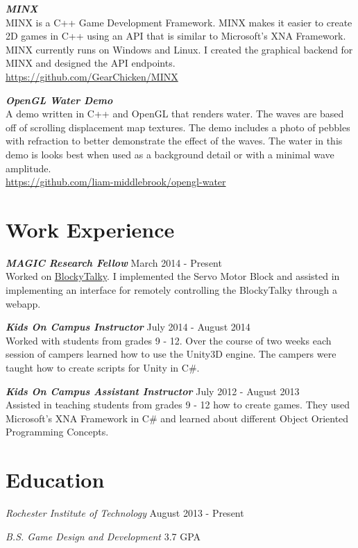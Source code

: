 \documentclass[line,margin]{res}
\begin{document}
\begin{resume}
{\textbf{\emph{MINX}}}\\
MINX is a C++ Game Development Framework. MINX makes it easier to create 2D games in C++ using an API
that is similar to Microsoft's XNA Framework. MINX currently runs on Windows and Linux. I created the
graphical backend for MINX and designed the API endpoints.\\
\url{https://github.com/GearChicken/MINX}

{\textbf{\emph{OpenGL Water Demo}}}\\
A demo written in C++ and OpenGL that renders water. The waves are based off of scrolling displacement
map textures. The demo includes a photo of pebbles with refraction to better demonstrate the effect
of the waves. The water in this demo is looks best when used as a background detail or with a minimal
wave amplitude.\\
\url{https://github.com/liam-middlebrook/opengl-water}


\section{Work Experience}

{\textbf{\emph{MAGIC Research Fellow}}} \hfill March 2014 - Present\\
Worked on \href{https://github.com/liam-middlebrook/blockytalky.git}{BlockyTalky}. I implemented
the Servo Motor Block and assisted in implementing an interface for remotely controlling the
BlockyTalky through a webapp.

{\textbf{\emph{Kids On Campus Instructor}}} \hfill July 2014 - August 2014\\
Worked with students from grades 9 - 12. Over the course of two weeks each session of campers
learned how to use the Unity3D engine. The campers were taught how to create scripts for Unity
in C\#.

{\textbf{\emph{Kids On Campus Assistant Instructor}}} \hfill July 2012 - August 2013\\
Assisted in teaching students from grades 9 - 12 how to create games. They used Microsoft's 
XNA Framework in C\# and learned about different Object Oriented Programming Concepts.


\section{Education}
{\sl Rochester Institute of Technology} \hfill August 2013 - Present

{\sl B.S. Game Design and Development} \hfill 3.7 GPA 



\end{resume}
\end{document}
